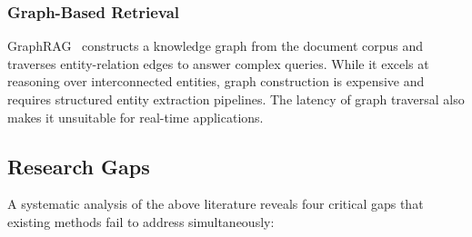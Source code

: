 \documentclass[12pt,a4paper]{article}
\begin{document}
\subsubsection{Graph-Based Retrieval}

GraphRAG~\cite{edge2024graphrag} constructs a knowledge graph from the
document corpus and traverses entity-relation edges to answer complex
queries. While it excels at reasoning over interconnected entities, graph
construction is expensive and requires structured entity extraction pipelines.
The latency of graph traversal also makes it unsuitable for real-time
applications.

\subsection{Research Gaps}

A systematic analysis of the above literature reveals four critical gaps
that existing methods fail to address simultaneously:
\end{document}
